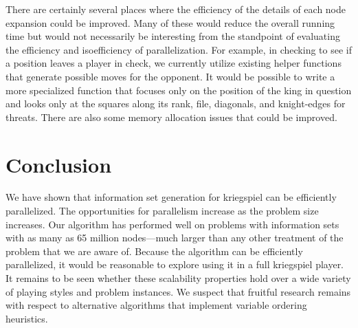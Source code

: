 \documentclass[conference]{IEEEtran}
\begin{document}
There are certainly several places where the efficiency of the details of each node expansion could be improved.  Many
of these would reduce the overall running time but would not necessarily be interesting from the standpoint of
evaluating the efficiency and isoefficiency of parallelization.  For example, in checking to see if a position leaves a
player in check, we currently utilize existing helper functions that generate possible moves for the opponent.  It would
be possible to write a more specialized function that focuses only on the position of the king in question and looks
only at the squares along its rank, file, diagonals, and knight-edges for threats.  There are also some memory
allocation issues that could be improved. 

\section{Conclusion}
We have shown that information set generation for kriegspiel can be efficiently parallelized.  The opportunities for
parallelism increase as the problem size increases.  Our algorithm has performed well on problems with information sets
with as many as 65 million nodes---much larger than any other treatment of the problem that we are aware of.  Because
the algorithm can be efficiently parallelized, it would be reasonable to explore using it in a full kriegspiel player.
It remains to be seen whether these scalability properties hold over a wide variety of playing styles and problem
instances.  We suspect that fruitful research remains with respect to alternative algorithms that implement variable
ordering heuristics.
\end{document}
